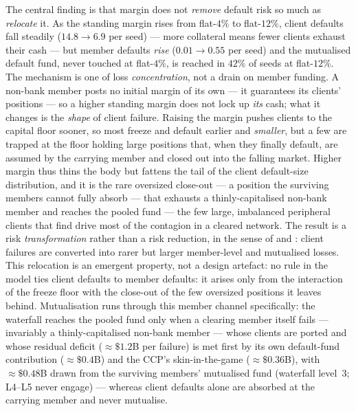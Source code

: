 The central finding is that margin does not \emph{remove} default risk so much as \emph{relocate} it. As the
standing margin rises from flat-$4\%$ to flat-$12\%$, client defaults fall steadily ($14.8 \to 6.9$ per
seed) --- more collateral means fewer clients exhaust their cash --- but member defaults \emph{rise}
($0.01 \to 0.55$ per seed) and the mutualised default fund, never touched at flat-$4\%$, is reached in
$42\%$ of seeds at flat-$12\%$. The mechanism is one of loss \emph{concentration}, not a drain on member
funding. A non-bank member posts no initial margin of its own --- it guarantees its clients' positions ---
so a higher standing margin does not lock up \emph{its} cash; what it changes is the \emph{shape} of client
failure. Raising the margin pushes clients to the capital floor sooner, so most freeze and default earlier
and \emph{smaller}, but a few are trapped at the floor holding large positions that, when they finally
default, are assumed by the carrying member and closed out into the falling market. Higher margin thus thins
the body but fattens the tail of the client default-size distribution, and it is the rare oversized
close-out --- a position the surviving members cannot fully absorb --- that exhausts a thinly-capitalised
non-bank member and reaches the pooled fund --- the few large, imbalanced peripheral clients that
\citet{paddrik_rajan_young_2020} find drive most of the contagion in a cleared network. The result is a
risk \emph{transformation} rather than a risk reduction, in the sense of \citet{cont_2017} and
\citet{biais_heider_hoerova_2016}: client failures are converted into rarer but larger member-level and
mutualised losses. This relocation is an emergent property, not a design artefact: no rule in the model
ties client defaults to member defaults: it arises only from the interaction of the freeze floor with
the close-out of the few oversized positions it leaves behind. Mutualisation runs
through this member channel specifically: the waterfall reaches the pooled fund only when a clearing member
itself fails --- invariably a thinly-capitalised non-bank member --- whose clients are ported and whose
residual deficit ($\approx\$1.2$B per failure) is met first by its own default-fund contribution
($\approx\$0.4$B) and the CCP's skin-in-the-game ($\approx\$0.36$B), with $\approx\$0.48$B drawn from the
surviving members' mutualised fund (waterfall level~$3$; L4--L5 never engage) --- whereas client defaults
alone are absorbed at the carrying member and never mutualise.

